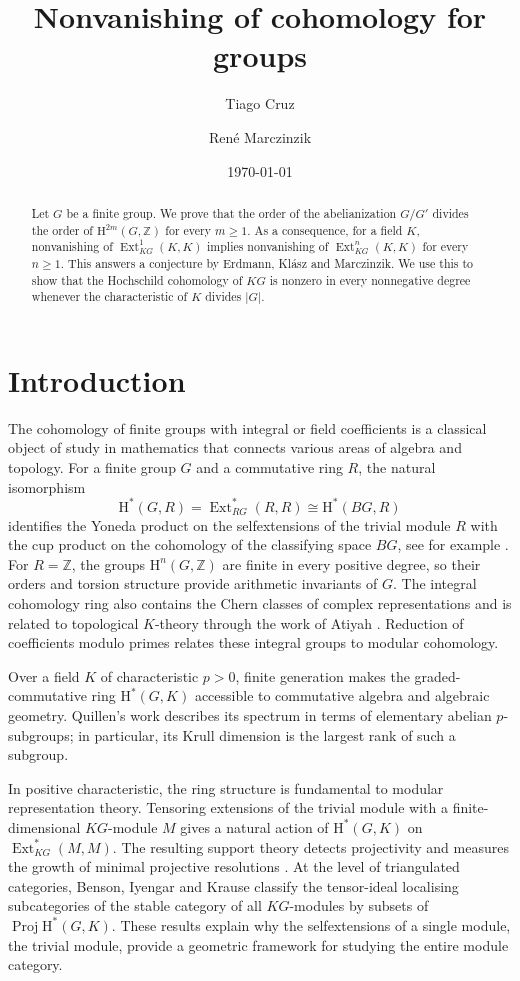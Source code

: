 \documentclass[11pt,a4paper]{amsart}
\title[Nonvanishing of cohomology for groups]{Nonvanishing of cohomology for groups}
\author{Tiago Cruz}
\author{Ren\'e Marczinzik}
\date{\today}
\numberwithin{equation}{section}
\DeclareMathOperator{\Ext}{Ext}
\newcommand{\HH}{\mathrm H}
\newcommand{\Z}{\mathbb Z}
\begin{document}
\begin{abstract}
Let $G$ be a finite group. We prove that the order of the
abelianization $G/G'$ divides the order of $\HH^{2m}(G,\Z)$
for every $m\geq1$. As a consequence, for a field $K$, nonvanishing
of $\Ext^1_{KG}(K,K)$ implies nonvanishing of
$\Ext^n_{KG}(K,K)$ for every $n\geq1$. 
This answers a conjecture by Erdmann, Kl\'asz and Marczinzik.
We use this to show that the Hochschild cohomology of $KG$ is nonzero
in every nonnegative degree whenever the characteristic of $K$
divides $|G|$.
\end{abstract}
\maketitle

\section*{Introduction}
The cohomology of finite groups with integral or field coefficients is a classical object of study in mathematics that connects various areas of algebra and topology. For a finite
group $G$ and a commutative ring $R$, the natural isomorphism
\[
 \HH^*(G,R)=\Ext^*_{RG}(R,R)\cong\HH^*(BG,R)
\]
identifies the Yoneda product on the selfextensions of the trivial
module $R$ with the cup product on the cohomology of the classifying
space $BG$, see for example \cite{Ben2}. For $R=\Z$, the groups
$\HH^n(G,\Z)$ are finite in every positive degree, so their orders
and torsion structure provide arithmetic invariants of $G$.
The integral cohomology ring also contains the Chern classes of
complex representations and is related to topological $K$-theory
through the work of Atiyah \cite{Ati}. Reduction of coefficients
modulo primes relates these integral groups to modular cohomology.


Over a field $K$ of characteristic $p>0$, finite generation
\cite{Eve} makes the graded-commutative ring $\HH^*(G,K)$ accessible
to commutative algebra and algebraic geometry. Quillen's work
\cite{Qui1,Qui2} describes its spectrum in terms of
elementary abelian $p$-subgroups; in particular, its Krull dimension
is the largest rank of such a subgroup. 

In positive characteristic, the ring structure is fundamental to
modular representation theory. Tensoring extensions of the trivial
module with a finite-dimensional $KG$-module $M$ gives a natural action of
$\HH^*(G,K)$ on $\Ext^*_{KG}(M,M)$. The resulting support theory
detects projectivity and measures the growth of minimal projective
resolutions \cite{Car,Ben2}. At the level of triangulated
categories, Benson, Iyengar and Krause \cite{BIK} classify the
tensor-ideal localising subcategories of the stable category of all
$KG$-modules by subsets of $\operatorname{Proj}\HH^*(G,K)$. These results explain
why the selfextensions of a single module, the trivial module,
provide a geometric framework for studying the entire module
category.
\end{document}

